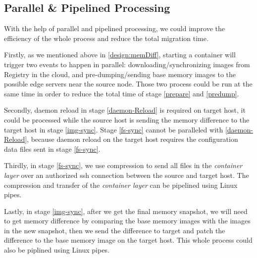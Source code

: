




\subsection{Parallel \&  Pipelined Processing}\label{design:pipe}

With the help of parallel and pipelined processing,  we could improve the efficiency of the whole process and reduce the total migration time.


Firstly, as we mentioned above in \ref{design:memDiff}, starting a container will trigger two events to happen in parallel: downloading/synchronizing images from Registry in the cloud, and pre-dumping/sending base memory images to the possible edge servers near the source node. Those two process could be run at the same time in order to reduce the total time of stage \ref{prepare} and \ref{predump}. 

Secondly, daemon reload in stage \ref{daemon-Reload} is required on target host, it could be processed while the source host is sending the memory difference to the target host in stage \ref{img-sync}. Stage \ref{fs-sync} cannot be paralleled with \ref{daemon-Reload}, because daemon reload on the target host requires the configuration data files sent in stage \ref{fs-sync}.

Thirdly,
in stage \ref{fs-sync}, we use compression to send all files in the \textit{container layer} over an authorized ssh connection between the source and target host. The compression and transfer of the \textit{container layer} can be pipelined using Linux pipes.

Lastly, in stage \ref{img-sync}, after we get the final memory snapshot, we will need to get memory difference by comparing the base memory images with the images in the new snapshot, then we send the difference to target and patch the difference to the base memory image on the target host. This whole process could also be piplined using Linux pipes. 
